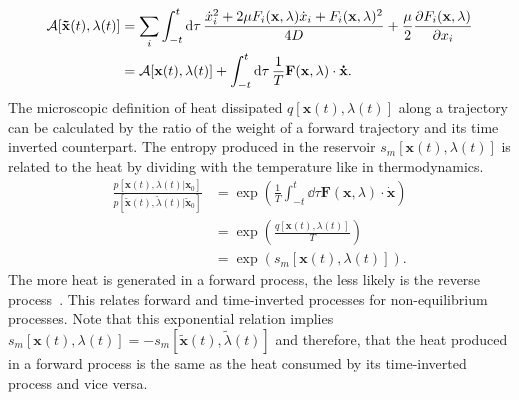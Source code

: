 \begin{equation}
\begin{aligned}
  \mathcal{A} [ \mathbf{  \tilde x}(t), \lambda(t) ] &= \sum_i \int_{-t}^t \dd{\tau} \frac{ \dot x_i^2 + 2\mu F_i(\mathbf{x},\lambda) \dot x_i + F_i(\mathbf{x},\lambda)^2 }{4D} + \frac{\mu}{2} \pdv{F_i(\mathbf{x},\lambda)}{x_i} \\
    &=  \mathcal{A} [ \mathbf{x}(t),\lambda(t) ] + \int_{-t}^t \dd{\tau} \frac{1}{T} \mathbf{F}(\mathbf{x},\lambda) \cdot \mathbf{\dot x}.
\end{aligned}
\end{equation}
The microscopic definition of heat dissipated $q[\mathbf{x}(t),\lambda(t)]$ along a trajectory  can be calculated by the ratio of the weight of a forward trajectory and its time inverted counterpart. The entropy produced in the reservoir $s_m [\mathbf{x}(t),\lambda(t)]$ is related to the heat by dividing with the temperature like in thermodynamics. 
\begin{equation}
\begin{aligned}
 \frac{p [\mathbf{x}(t),\lambda(t) | \mathbf{x}_0]}{p [\mathbf{\tilde x}(t), \tilde \lambda(t) |\mathbf{ \tilde x}_0]} &= \exp \left ( \frac{1}{T} \int_{-t}^t \dd{\tau} \mathbf{F}(\mathbf{x},\lambda) \cdot \mathbf{\dot x} \right ) \\
 &= \exp \left ( \frac{ q [\mathbf{x}(t),\lambda(t)]}{T}  \right ) \\
&= \exp \left ( s_m [\mathbf{x}(t),\lambda(t)]  \right ).
\end{aligned}
\label{eq:microscopicBal}
\end{equation}
The more heat is generated in a forward process, the less likely is the reverse process~\cite{seifert2008stochastic}. This relates forward and time-inverted processes for non-equilibrium processes. Note that this exponential relation implies $s_m [\mathbf{x}(t),\lambda(t)] = -s_m [ \mathbf{\tilde x}(t),\tilde \lambda(t)]$ and therefore, that the heat produced in a forward process is the same as the heat consumed by its time-inverted process and vice versa.   

